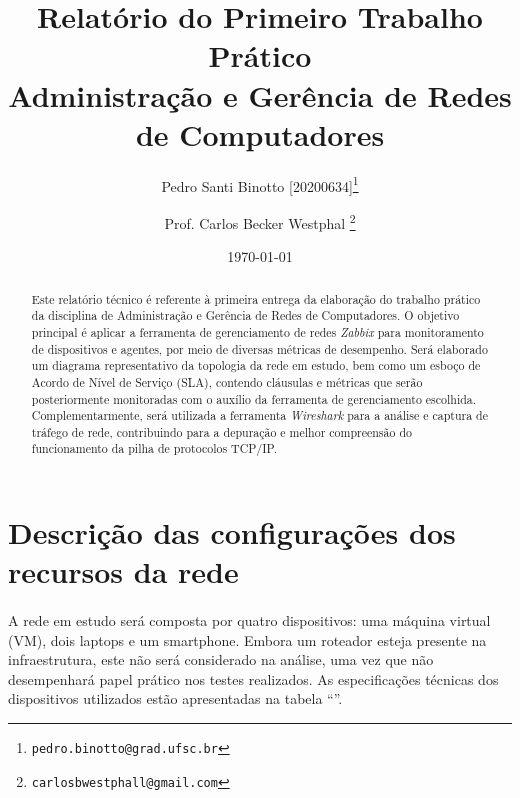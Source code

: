 \documentclass[12pt]{article}
\title{Relatório do Primeiro Trabalho Prático \\ [0.2em]\smaller{}Administração e Gerência de Redes de Computadores}
\author[1]{Pedro Santi Binotto [20200634]\thanks{\texttt{pedro.binotto@grad.ufsc.br}}}
\author[1]{Prof. Carlos Becker Westphal \thanks{\texttt{carlosbwestphall@gmail.com}}}
\date{\today}
\affil[1]{Departamento de Informática e Estatística, Centro Tecnológico \protect\\ Universidade Federal de Santa Catarina}
\begin{document}
\begin{titlepage}
\maketitle
\thispagestyle{empty}

\begin{abstract}
Este relatório técnico é referente à primeira entrega da elaboração do trabalho prático da disciplina de Administração e
Gerência de Redes de Computadores. O objetivo principal é aplicar a ferramenta de gerenciamento de redes \textit{Zabbix}
para monitoramento de dispositivos e agentes, por meio de diversas métricas de desempenho. Será elaborado um
diagrama representativo da topologia da rede em estudo, bem como um esboço de Acordo de Nível de Serviço (SLA), contendo
cláusulas e métricas que serão posteriormente monitoradas com o auxílio da ferramenta de gerenciamento escolhida.
Complementarmente, será utilizada a ferramenta \textit{Wireshark} para a análise e captura de tráfego de rede, contribuindo para
a depuração e melhor compreensão do funcionamento da pilha de protocolos TCP/IP.
\end{abstract}

\end{titlepage}

\tableofcontents

\printglossary[title=Glossário, toctitle=Glossário]

\section{Descrição das configurações dos recursos da rede}
\paragraph{}
A rede em estudo será composta por quatro dispositivos: uma máquina virtual (VM), dois laptops e um smartphone. Embora
um roteador esteja presente na infraestrutura, este não será considerado na análise, uma vez que não desempenhará papel
prático nos testes realizados. As especificações técnicas dos dispositivos utilizados estão apresentadas na tabela
``''.
\end{document}
